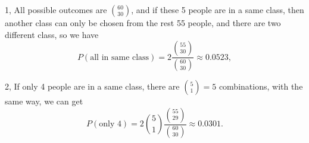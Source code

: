 \documentclass[14pt]{elegantbook}
\begin{document}
    \begin{solution}

        1, All possible outcomes are $\binom{60}{30}$, and if these 5 people are in a same class, then another class can only be chosen from the rest 55 people, and there are two different class, so we have
        \[
            P(\text{all in same class})=2\frac{\binom{55}{30}}{\binom{60}{30}}\approx 0.0523, 
        \]

        2, If only 4 people are in a same class, there are $\binom{5}{1}=5$ combinations, with the same way, we can get 
        \[
            P(\text{only 4})=2\binom{5}{1}\frac{\binom{55}{29}}{\binom{60}{30}}\approx 0.0301. 
        \]
    \end{solution}
\end{document}
